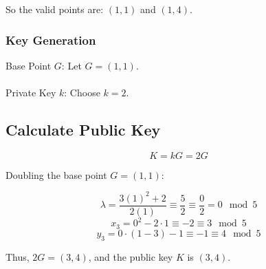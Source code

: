 \documentclass[11pt, letterpaper]{article}
\begin{document}
So the valid points are: \((1, 1)\) and \((1, 4)\).

\subsubsection*{Key Generation}
Base Point \(G\): Let \(G = (1, 1)\).
\\ \\
Private Key \(k\): Choose \(k = 2\).

\subsection*{Calculate Public Key}
\begin{equation}
K = kG = 2G
\end{equation}

Doubling the base point \(G = (1, 1)\):

\begin{equation}
\lambda = \frac{3(1)^2 + 2}{2(1)} \equiv \frac{5}{2} \equiv \frac{0}{2} = 0 \mod 5
\end{equation}
\begin{equation}
x_3 = 0^2 - 2 \cdot 1 \equiv -2 \equiv 3 \mod 5
\end{equation}
\begin{equation}
y_3 = 0 \cdot (1 - 3) - 1 \equiv -1 \equiv 4 \mod 5
\end{equation}

Thus, \(2G = (3, 4)\), and the public key \(K\) is \((3, 4)\).
\end{document}
